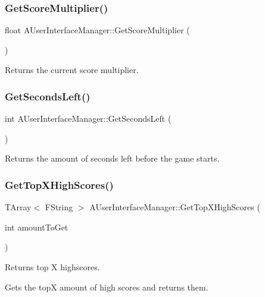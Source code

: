 \subsubsection{GetScoreMultiplier()}
{\footnotesize\ttfamily float A\+User\+Interface\+Manager\+::\+Get\+Score\+Multiplier (\begin{DoxyParamCaption}{ }\end{DoxyParamCaption})}



Returns the current score multiplier. 

\mbox{\label{class_a_user_interface_manager_ab66c9bb0fe8cdf1521d072d32b1db1ce}} 
\subsubsection{GetSecondsLeft()}
{\footnotesize\ttfamily int A\+User\+Interface\+Manager\+::\+Get\+Seconds\+Left (\begin{DoxyParamCaption}{ }\end{DoxyParamCaption})}



Returns the amount of seconds left before the game starts. 

\mbox{\label{class_a_user_interface_manager_a10887916bdb9f032b3e9b0782a2326a5}} 
\subsubsection{GetTopXHighScores()}
{\footnotesize\ttfamily T\+Array$<$ F\+String $>$ A\+User\+Interface\+Manager\+::\+Get\+Top\+X\+High\+Scores (\begin{DoxyParamCaption}\item[{int}]{amount\+To\+Get }\end{DoxyParamCaption})}



Returns top X highscores. 

Gets the topX amount of high scores and returns them. \mbox{\label{class_a_user_interface_manager_ad0145ad451603ce045b9665fdadf5be4}} 

